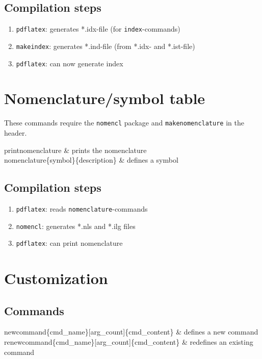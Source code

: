     \subsection{Compilation steps}
        \begin{enumerate}
            \item \texttt{pdflatex}: generates *.idx-file (for \texttt{\bs index}-commands)
            \item \texttt{makeindex}: generates *.ind-file (from *.idx- and *.ist-file)
            \item \texttt{pdflatex}: can now generate index
        \end{enumerate}

\section{Nomenclature/symbol table}
    These commands require the \texttt{nomencl} package and \texttt{\bs makenomenclature} in the header.
    
    \begin{cmdtab}
        \bs printnomenclature & prints the nomenclature \\
        \bs nomenclature\{symbol\}\{description\} & defines a symbol \\
    \end{cmdtab}
    
    \subsection{Compilation steps}
        \begin{enumerate}
            \item \texttt{pdflatex}: reads \texttt{\bs nomenclature}-commands
            \item \texttt{nomencl}: generates *.nls and *.ilg files
            \item \texttt{pdflatex}: can print nomenclature
        \end{enumerate}

\section{Customization}
    \subsection{Commands}
        \begin{cmdtab}
            \bs newcommand\{\bs cmd\_name\}[arg\_count]\{cmd\_content\} & defines a new command \\
            \bs renewcommand\{\bs cmd\_name\}[arg\_count]\{cmd\_content\} & redefines an existing command \\
        \end{cmdtab}
    
